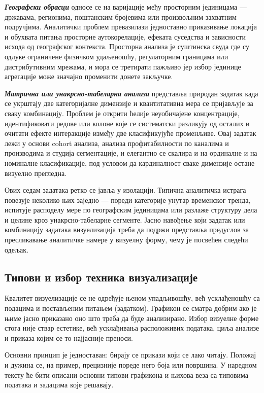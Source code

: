 \textbf{\textit{Географски обрасци}} односе се на варијације међу просторним јединицама — државама, регионима, поштанским бројевима или произвољним захватним подручјима. Аналитички проблем превазилази једноставно приказивање локација и обухвата питања просторне аутокорелације, ефеката суседства и зависности исхода од географског контекста. Просторна анализа је суштинска свуда где су одлуке ограничене физичком удаљеношћу, регулаторним границама или дистрибутивним мрежама, и мора се третирати пажљиво јер избор јединице агрегације може значајно променити донете закључке.

\textbf{\textit{Матрична или унакрсно-табеларна анализа}} представља природан задатак када се укрштају две категоријалне димензије и квантитативна мера се пријављује за сваку комбинацију. Проблем је открити ћелије неуобичајене концентрације, идентификовати редове или колоне које се систематски разликују од осталих и очитати ефекте интеракције између две класификујуће променљиве. Овај задатак лежи у основи cohort анализа, анализа профитабилности по каналима и производима и студија сегментације, и елегантно се скалира и на ординалне и на номиналне класификације, под условом да кардиналност сваке димензије остане визуелно прегледна.

Ових седам задатака ретко се јавља у изолацији. Типична аналитичка истрага повезује неколико њих заједно — пореди категорије унутар временског тренда, испитује расподелу мере по географским јединицама или разлаже структуру дела и целине кроз унакрсно-табеларне сегменте. Јасно навођење који задатак или комбинацију задатака визуелизација треба да подржи представља предуслов за пресликавање аналитичке намере у визуелну форму, чему је посвећен следећи одељак.

\subsection{Типови и избор техника визуализације}
Квалитет визуелизације се не одређује њеном упадљивошћу, већ усклађеношћу са подацима и постављеним питањем (задатком). Графикон се сматра добрим ако је њиме јасно приказано оно што треба да буде анализирано. Избор визуелне форме стога није ствар естетике, већ усклађивања расположивих података, циља анализе и приказа којим се то најјасније преноси.

Основни принцип је једноставан: бирају се прикази који се лако читају. Положај и дужина се, на пример, прецизније пореде него боја или површина. У наредном тексту ће бити описани основни типови графикона и њихова веза са типовима података и задацима које решавају.

